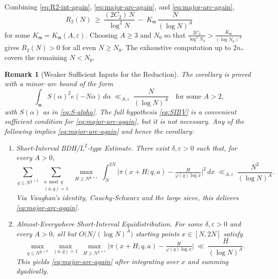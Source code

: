 \documentclass[11pt]{article}
\makeatletter
\theoremstyle{inline}
\newtheorem*{remark}{Remark}
\theoremstyle{break}
\renewenvironment{proof}[1][\proofname]{%
  \par\pushQED{\qed}%
  \normalfont \topsep6\p@\@plus6\p@\relax
  \trivlist
  \item[\hskip\labelsep
        \itshape
    #1\@addpunct{.}]\mbox{}\\  %
}{%
  \popQED\endtrivlist\@endpefalse
}
\theoremstyle{break}
\theoremstyle{break}
\theoremstyle{break}
\theoremstyle{break}
\theoremstyle{break}
\theoremstyle{break}
\theoremstyle{inline}
\newcommand{\Kminor}{K_{\mathfrak m}}           %
\newcommand{\nprodstar}{n_{\ast}}  %
\makeatother
\begin{document}
\begin{proof}
\medskip
Combining \eqref{eq:R2-int-again}, \eqref{eq:major-arc-again}, and \eqref{eq:major-arc-again},
\begin{equation}
R_2(N)\ \ge\ \frac{(2C_2)\,N}{\log^2 N}\ -\ \Kminor\,\frac{N}{(\log N)^A}
\end{equation}
for some \(\Kminor=\Kminor(A,\varepsilon)\). Choosing \(A\ge 3\) and \(N_0\) so that \(\frac{2C_2}{\log^2 N_0}>\frac{\Kminor}{(\log N_0)^A}\) gives \(R_2(N)>0\) for all even \(N\ge N_0\). The exhaustive computation up to \(2\nprodstar\) covers the remaining \(N< N_0\).
\end{proof}

\begin{remark}[Weaker Sufficient Inputs for the Reduction]
\label{rem:weaker-inputs}
The corollary is proved with a minor--arc bound of the form
\begin{equation}\label{eq:major-arc-again}
\int_{\mathfrak m} S(\alpha)^2 e(-N\alpha)\,d\alpha\ \ll_{A,\varepsilon}\ \frac{N}{(\log N)^A}
\quad\text{for some }A>2,
\end{equation}
with \(S(\alpha)\) as in \eqref{eq:S-alpha}. The full hypothesis \eqref{eq:SIBV} is a convenient sufficient condition for \eqref{eq:major-arc-again}, but it is not necessary. Any of the following implies \eqref{eq:major-arc-again} and hence the corollary:

\begin{enumerate}
\item[\textnormal{(i)}] \emph{Short-Interval BDH/\(L^2\)-type Estimate.}
There exist \(\delta,\varepsilon>0\) such that, for every \(A>0\),
\begin{equation}
\sum_{q\le N^{\frac{1}{2}+\delta}}\ \sum_{\substack{a\bmod q\\(a,q)=1}}
\ \max_{H\ge N^{\frac{1}{2}+\varepsilon}}\ 
\int_{N}^{2N}\bigl|\pi(x+H;q,a)-\tfrac{H}{\varphi(q)\log x}\bigr|^2\,dx
\ \ll_{A,\varepsilon}\ \frac{N^2}{(\log N)^A}.
\end{equation}
Via Vaughan’s identity, Cauchy-Schwarz and the large sieve, this delivers \eqref{eq:major-arc-again}.


\item[\textnormal{(ii)}] \emph{Almost-Everywhere Short-Interval Equidistribution.}
For some \(\delta,\varepsilon>0\) and every \(A>0\), all but \(O\!\big(N/(\log N)^A\big)\) starting points \(x\in[N,2N]\) satisfy
\[
\max_{q\le N^{\frac{1}{2}+\delta}}\ \max_{(a,q)=1}\ \max_{H\ge N^{\frac{1}{2}+\varepsilon}}
\bigl|\pi(x+H;q,a)-\tfrac{H}{\varphi(q)\log x}\bigr|\ \ll\ \frac{H}{(\log N)^{A}}.
\]
This yields \eqref{eq:major-arc-again} after integrating over \(x\) and summing dyadically.


\end{enumerate}
\end{remark}
\end{document}
